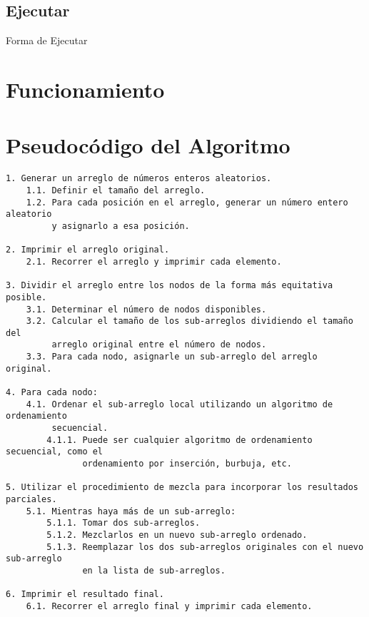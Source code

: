 \documentclass[a4paper,12pt]{article}
\begin{document}
\subsection*{Ejecutar}
\begin{center}
    Forma de Ejecutar
\end{center}

\section*{Funcionamiento}



\section*{Pseudocódigo del Algoritmo}


\begin{verbatim}
1. Generar un arreglo de números enteros aleatorios.
    1.1. Definir el tamaño del arreglo.
    1.2. Para cada posición en el arreglo, generar un número entero aleatorio
         y asignarlo a esa posición.

2. Imprimir el arreglo original.
    2.1. Recorrer el arreglo y imprimir cada elemento.

3. Dividir el arreglo entre los nodos de la forma más equitativa posible.
    3.1. Determinar el número de nodos disponibles.
    3.2. Calcular el tamaño de los sub-arreglos dividiendo el tamaño del 
         arreglo original entre el número de nodos.
    3.3. Para cada nodo, asignarle un sub-arreglo del arreglo original.

4. Para cada nodo:
    4.1. Ordenar el sub-arreglo local utilizando un algoritmo de ordenamiento
         secuencial.
        4.1.1. Puede ser cualquier algoritmo de ordenamiento secuencial, como el
               ordenamiento por inserción, burbuja, etc.

5. Utilizar el procedimiento de mezcla para incorporar los resultados parciales.
    5.1. Mientras haya más de un sub-arreglo:
        5.1.1. Tomar dos sub-arreglos.
        5.1.2. Mezclarlos en un nuevo sub-arreglo ordenado.
        5.1.3. Reemplazar los dos sub-arreglos originales con el nuevo sub-arreglo
               en la lista de sub-arreglos.

6. Imprimir el resultado final.
    6.1. Recorrer el arreglo final y imprimir cada elemento.
\end{verbatim}

\end{document}
